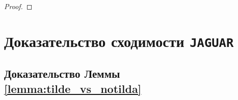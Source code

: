 \begin{proof}





    \end{proof}

\section{Доказательство сходимости \texttt{JAGUAR}} \label{appendix:JAGUAR}

\subsection{Доказательство Леммы \ref{lemma:tilde_vs_notilda}}

        

